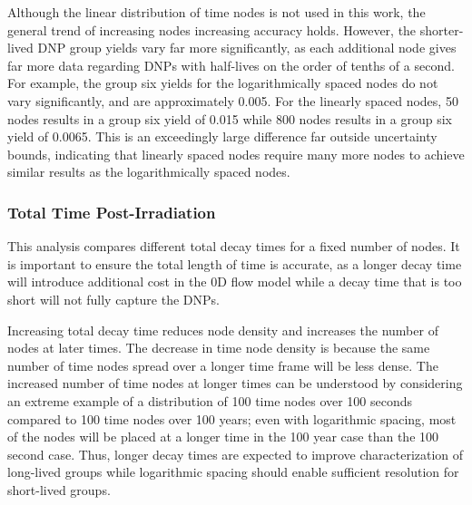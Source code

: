 Although the linear distribution of time nodes is not used in this work, the general trend of increasing nodes increasing accuracy holds.
However, the shorter-lived \gls{DNP} group yields vary far more significantly, as each additional node gives far more data regarding \glspl{DNP} with half-lives on the order of tenths of a second.
For example, the group six yields for the logarithmically spaced nodes do not vary significantly, and are approximately 0.005.
For the linearly spaced nodes, 50 nodes results in a group six yield of 0.015 while 800 nodes results in a group six yield of 0.0065.
This is an exceedingly large difference far outside uncertainty bounds, indicating that linearly spaced nodes require many more nodes to achieve similar results as the logarithmically spaced nodes.

\FloatBarrier
\subsubsection{Total Time Post-Irradiation}
\label{sec:total-decay-time}
This analysis compares different total decay times for a fixed number of nodes.
It is important to ensure the total length of time is accurate, as a longer decay time will introduce additional cost in the 0D flow model while a decay time that is too short will not fully capture the \glspl{DNP}.

Increasing total decay time reduces node density and increases the number of nodes at later times.
The decrease in time node density is because the same number of time nodes spread over a longer time frame will be less dense.
The increased number of time nodes at longer times can be understood by considering an extreme example of a distribution of 100 time nodes over 100 seconds compared to 100 time nodes over 100 years; even with logarithmic spacing, most of the nodes will be placed at a longer time in the 100 year case than the 100 second case.
Thus, longer decay times are expected to improve characterization of long-lived groups while logarithmic spacing should enable sufficient resolution for short-lived groups.

